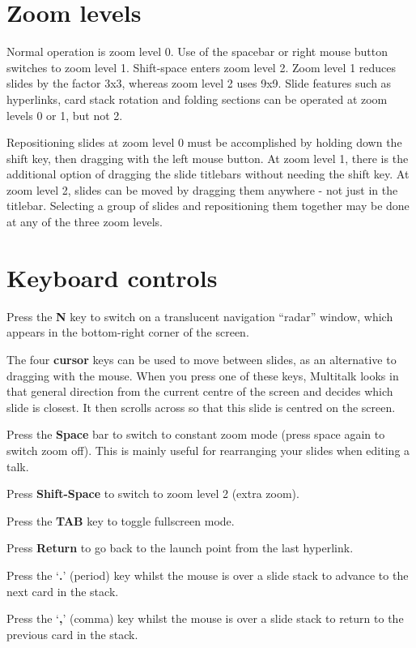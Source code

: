 \documentclass[12pt,a4paper,twoside]{article}
\renewcommand{\_}{\texttt{\symbol{95}}}
\begin{document}
\section{Zoom levels}

Normal operation is zoom level 0. Use of the spacebar or right mouse button
switches to zoom level 1. Shift-space enters zoom level 2. Zoom level 1
reduces slides by the factor 3x3, whereas zoom level 2 uses 9x9.
Slide features such as hyperlinks, card stack rotation and folding
sections can be operated at zoom levels 0 or 1, but not 2.

Repositioning
slides at zoom level 0 must be accomplished by holding down the shift
key, then dragging with the left mouse button. At zoom level 1, there
is the additional option of dragging the slide titlebars without
needing the shift key. At zoom level 2, slides can be moved by dragging
them anywhere - not just in the titlebar.
Selecting a group of slides and repositioning them together may be
done at any of the three zoom levels.

\section{Keyboard controls}

Press the \textbf{N} key to switch on a translucent navigation
``radar'' window, which appears in the bottom-right corner of the screen.

The four \textbf{cursor} keys can be used to move between slides, as an
alternative to dragging with the mouse. When you press one of these
keys, Multitalk looks in that general direction from the current
centre of the screen and decides which slide is closest. It then
scrolls across so that this slide is centred on the screen.

Press the \textbf{Space} bar to switch to constant zoom mode (press space
again to switch zoom off). This is mainly useful for rearranging
your slides when editing a talk.

Press \textbf{Shift-Space} to switch to zoom level 2 (extra zoom).

Press the \textbf{TAB} key to toggle fullscreen mode.

Press \textbf{Return} to go back to the launch point from the last hyperlink.

Press the `\textbf{.}' (period) key whilst the mouse is over a slide stack to
advance to the next card in the stack.

Press the `\textbf{,}' (comma) key whilst the mouse is over a slide stack to
return to the previous card in the stack.
\end{document}
